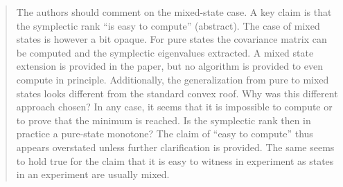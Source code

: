 \documentclass[a4paper,12pt]{article}
\newenvironment{Referee}[1]
{\noindent {\bf Comment #1:} \begin{quote} }
{\end{quote}\vspace{0 cm}}
\begin{document}
\begin{Referee}{4}
The authors should comment on the mixed-state case. A key claim is that the symplectic rank ``is easy to compute'' (abstract). The case of mixed states is however a bit opaque. For pure states the covariance matrix can be computed and the symplectic eigenvalues extracted. A mixed state extension is provided in the paper, but no algorithm is provided to even compute in principle. Additionally, the generalization from pure to mixed states looks different from the standard convex roof. Why was this different approach chosen? In any case, it seems that it is impossible to compute or to prove that the minimum is reached. Is the symplectic rank then in practice a pure-state monotone? The claim of ``easy to compute'' thus appears overstated unless further clarification is provided. The same seems to hold true for the claim that it is easy to witness in experiment as states in an experiment are usually mixed.
\end{Referee}
\end{document}
